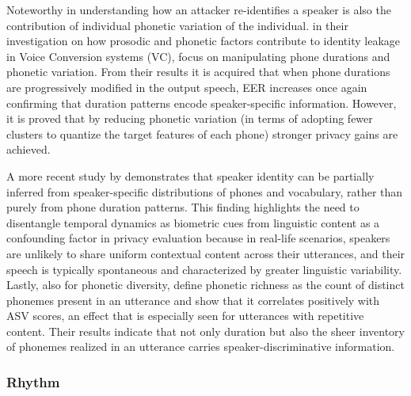 \documentclass[12pt,leqno,a4paper]{article}
\begin{document}
Noteworthy in understanding how an attacker re-identifies a speaker is also the contribution of individual phonetic variation of the individual. 
\cite{franzreb_private_2025} in their investigation on how prosodic and phonetic factors contribute to identity leakage in Voice Conversion systems (VC), 
focus on manipulating phone durations and phonetic variation. From their results it is acquired that when phone durations are progressively modified in the output speech, 
EER increases once again confirming that duration patterns encode speaker-specific information. However, it is proved that by reducing phonetic variation (in terms of adopting fewer clusters to quantize the target features of each phone) 
stronger privacy gains are achieved.

A more recent study by \cite{franzreb_content_2026} demonstrates that speaker identity can be partially inferred from speaker-specific distributions of phones and vocabulary, rather than purely from phone duration patterns. This finding highlights the need to 
disentangle temporal dynamics as biometric cues from linguistic content as a confounding factor in privacy evaluation because in real-life scenarios, 
speakers are unlikely to share uniform contextual content across their utterances, and their speech is typically spontaneous and characterized by 
greater linguistic variability. Lastly, also for phonetic diversity, \cite{klein_phonetic_2024} define phonetic richness as the 
count of distinct phonemes present in an utterance and show that it correlates positively with ASV scores, an effect that is especially seen 
for utterances with repetitive content. Their results indicate that not only duration but also the sheer inventory of phonemes realized in an 
utterance carries speaker-discriminative information.

\subsubsection{Rhythm}
\end{document}
